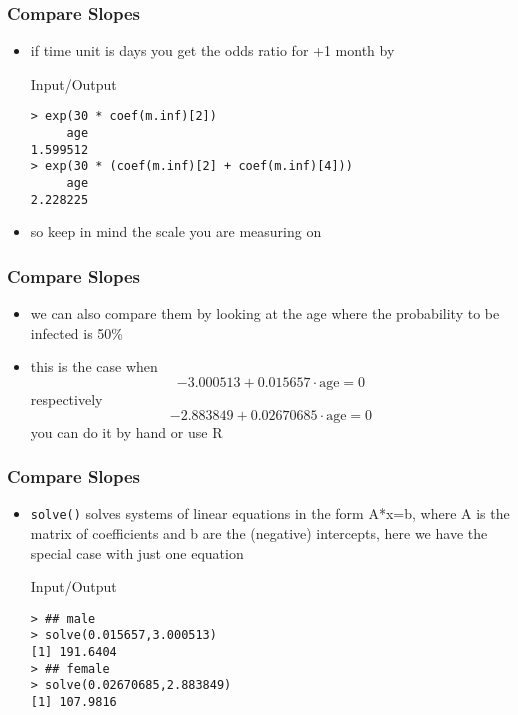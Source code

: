 \begin{frame}[fragile]\frametitle{Compare Slopes}
  \begin{itemize}
  \item if time unit is days you get the odds ratio for +1 month   by
  \begin{exampleblock}{Input/Output}\small
\begin{verbatim}
> exp(30 * coef(m.inf)[2])
     age 
1.599512 
> exp(30 * (coef(m.inf)[2] + coef(m.inf)[4]))
     age 
2.228225 
\end{verbatim}
  \end{exampleblock}
\item so keep in mind the scale you are measuring on
\end{itemize}
\end{frame}

  \begin{frame}[fragile]\frametitle{Compare Slopes}
\begin{itemize}
\item we can also compare them by looking at the age where the probability to be infected is 50\%
\item this is the case when $$-3.000513 + 0.015657 \cdot \mbox{age}=0$$  respectively $$-2.883849 + 0.02670685  \cdot \mbox{age}=0$$ you can do it by hand or use R
\end{itemize}
\end{frame}

\begin{frame}[fragile]\frametitle{Compare Slopes}
\begin{itemize}
\item \texttt{solve()} solves systems of linear equations in the form A*x=b, where A is the matrix of coefficients and b are the (negative) intercepts, here we have the special case with just one equation
  \begin{exampleblock}{Input/Output}\small
\begin{verbatim}
> ## male
> solve(0.015657,3.000513)
[1] 191.6404
> ## female
> solve(0.02670685,2.883849)
[1] 107.9816
\end{verbatim}
  \end{exampleblock}

\end{itemize}
\end{frame}

